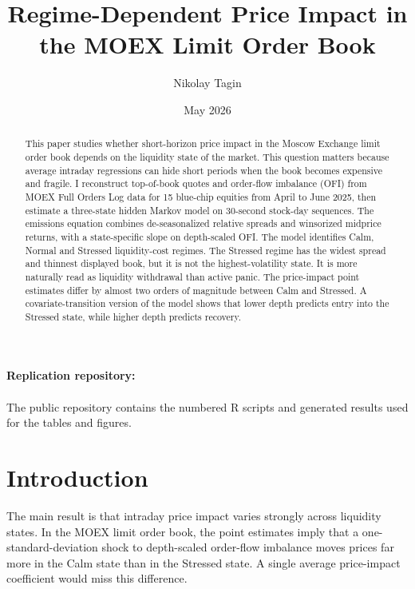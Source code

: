 \documentclass[12pt,a4paper]{article}
\title{Regime-Dependent Price Impact in the MOEX Limit Order Book}
\author{Nikolay Tagin}
\date{May 2026}
\begin{document}
\maketitle

\begin{abstract}
\hspace*{\parindent}This paper studies whether short-horizon price impact in the Moscow Exchange limit order book depends on the liquidity state of the market. This question matters because average intraday regressions can hide short periods when the book becomes expensive and fragile. I reconstruct top-of-book quotes and order-flow imbalance (OFI) from MOEX Full Orders Log data for 15 blue-chip equities from April to June 2025, then estimate a three-state hidden Markov model on 30-second stock-day sequences. The emissions equation combines de-seasonalized relative spreads and winsorized midprice returns, with a state-specific slope on depth-scaled OFI. The model identifies Calm, Normal  and Stressed liquidity-cost regimes. The Stressed regime has the widest spread and thinnest displayed book, but it is not the highest-volatility state. It is more naturally read as liquidity withdrawal than active panic. The price-impact point estimates differ by almost two orders of magnitude between Calm and Stressed. A covariate-transition version of the model shows that lower depth predicts entry into the Stressed state, while higher depth predicts recovery.
\end{abstract}

\begin{center}
\small
\textbf{Replication repository:}\\
\\
The public repository contains the numbered R scripts and generated results used for the tables and figures.
\end{center}

\clearpage
\tableofcontents
\clearpage

\section{Introduction}\label{sec:introduction}

The main result is that intraday price impact varies strongly across liquidity states. In the MOEX limit order book, the point estimates imply that a one-standard-deviation shock to depth-scaled order-flow imbalance moves prices far more in the Calm state than in the Stressed state. A single average price-impact coefficient would miss this difference.
\end{document}
